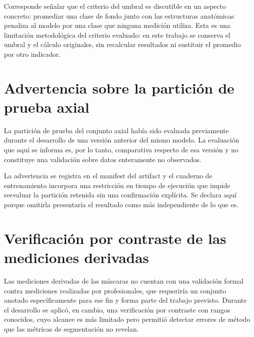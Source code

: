 Corresponde señalar que el criterio del umbral es discutible en un aspecto concreto: promediar una clase de fondo junto con las estructuras anatómicas penaliza al modelo por una clase que ninguna medición utiliza. Esta es una limitación metodológica del criterio evaluado: en este trabajo se conserva el umbral y el cálculo originales, sin recalcular resultados ni sustituir el promedio por otro indicador.

\section{Advertencia sobre la partición de prueba axial}

La partición de prueba del conjunto axial había sido evaluada previamente durante el desarrollo de una versión anterior del mismo modelo. La evaluación que aquí se informa es, por lo tanto, comparativa respecto de esa versión y no constituye una validación sobre datos enteramente no observados.

La advertencia se registra en el manifest del artifact y el cuaderno de entrenamiento incorpora una restricción en tiempo de ejecución que impide reevaluar la partición retenida sin una confirmación explícita. Se declara aquí porque omitirla presentaría el resultado como más independiente de lo que es.

\section{Verificación por contraste de las mediciones derivadas}

Las mediciones derivadas de las máscaras no cuentan con una validación formal contra mediciones realizadas por profesionales, que requeriría un conjunto anotado específicamente para ese fin y forma parte del trabajo previsto. Durante el desarrollo se aplicó, en cambio, una verificación por contraste con rangos conocidos, cuyo alcance es más limitado pero permitió detectar errores de método que las métricas de segmentación no revelan.

